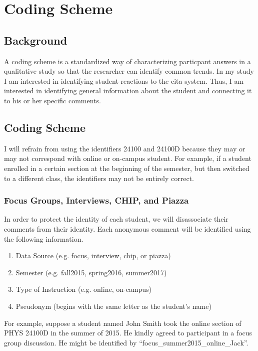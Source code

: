 \chapter[Coding Scheme]{Coding Scheme}

\section{Background}

A coding scheme is a standardized way of characterizing particpant answers in a qualitative study so that the researcher can identify common trends. In my study I am interested in identifying student reactions to the \gls{cita} system\cite{patton2015}. Thus, I am interested in identifying general information about the student and connecting it to his or her specific comments.

\section{Coding Scheme}

I will refrain from using the identifiers 24100 and 24100D because they may or may not correspond with online or on-campus student. For example, if a student enrolled in a certain section at the beginning of the semester, but then switched to a different class, the identifiers may not be entirely correct.

\subsection{Focus Groups, Interviews, CHIP, and Piazza}

In order to protect the identity of each student, we will disassociate their comments from their identity. Each anonymous comment will be identified using the following information.

\begin{enumerate}
\item Data Source (e.g. focus, interview, chip, or piazza)
\item Semester (e.g. fall2015, spring2016, summer2017)
\item Type of Instruction (e.g. online, on-campus)
\item Pseudonym (begins with the same letter as the student's name)
\end{enumerate}

For example, suppose a student named John Smith took the online section of PHYS 24100D in the summer of 2015. He kindly agreed to participant in a focus group discussion. He might be identified by ``focus\_summer2015\_online\_Jack''.

